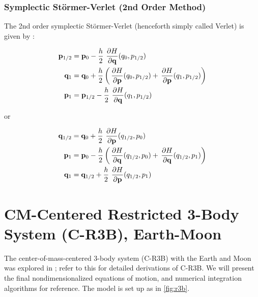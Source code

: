 \subsubsection{Symplectic Störmer-Verlet (2nd Order Method)}

The 2nd order symplectic Störmer-Verlet (henceforth simply called Verlet) is given by \cite{Hairer}:

\begin{equation}
    \begin{split} \label{eq:symplectic-verlet1}
        \mathbf{p}_{1/2} &= \mathbf{p}_0 - \frac{h}{2} \operatorname{}\frac{\partial H}{\partial \mathbf{q}}(q_0, p_{1/2}) \\
        \mathbf{q}_1 &= \mathbf{q}_0 + \frac{h}{2} \left( \operatorname{}\frac{\partial H}{\partial \mathbf{p}}(q_0, p_{1/2}) + \operatorname{}\frac{\partial H}{\partial \mathbf{p}}(q_1, p_{1/2}) \right) \\
        \mathbf{p}_{1} &= \mathbf{p}_{1/2} - \frac{h}{2} \operatorname{}\frac{\partial H}{\partial \mathbf{q}}(q_1, p_{1/2}) \\
    \end{split}
\end{equation}

or

\begin{equation}
    \begin{split} \label{eq:symplectic-verlet2}
        \mathbf{q}_{1/2} &= \mathbf{q}_0 + \frac{h}{2} \operatorname{}\frac{\partial H}{\partial \mathbf{p}}(q_{1/2}, p_0) \\
        \mathbf{p}_1 &= \mathbf{p}_0 - \frac{h}{2} \left( \operatorname{}\frac{\partial H}{\partial \mathbf{q}}(q_{1/2}, p_0) + \operatorname{}\frac{\partial H}{\partial \mathbf{q}}(q_{1/2}, p_1) \right) \\
        \mathbf{q}_{1} &= \mathbf{q}_{1/2} + \frac{h}{2} \operatorname{}\frac{\partial H}{\partial \mathbf{p}}(q_{1/2}, p_1) \\
    \end{split}
\end{equation}



\section{CM-Centered Restricted 3-Body System (C-R3B), Earth-Moon}
The center-of-mass-centered 3-body system (C-R3B) with the Earth and Moon was explored in \cite{Saxe2015}; refer to this for detailed derivations of C-R3B. We will present the final nondimensionalized equations of motion, and numerical integration algorithms for reference. The model is set up as in \cref{fig:r3b}.


